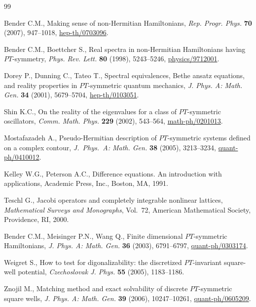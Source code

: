 \documentclass[pdftex]{sigma}
\numberwithin{equation}{section}
\begin{document}
\begin{thebibliography}{99}

\footnotesize\itemsep=0pt

\bibitem{[1]} Bender C.M., Making sense of non-Hermitian Hamiltonians,
\textit{Rep. Progr. Phys.} \textbf{70} (2007), 947--1018, \mbox{\href{http://arxiv.org/abs/hep-th/0703096}{hep-th/0703096}}.

\bibitem{[2]} Bender C.M., Boettcher S., Real spectra in non-Hermitian
Hamiltonians having $PT$-symmetry, \textit{Phys. Rev. Lett.} \textbf{80}
(1998), 5243--5246, \href{http://arxiv.org/abs/physics/9712001}{physics/9712001}.

\bibitem{[3]} Dorey P., Dunning C., Tateo T., Spectral equivalences, Bethe
ansatz equations, and reality properties in $PT$-symmetric quantum
mechanics, \textit{J. Phys. A: Math. Gen.} \textbf{34} (2001), 5679--5704, \href{http://arxiv.org/abs/hep-th/0103051}{hep-th/0103051}.

\bibitem{[4]} Shin K.C., On the reality of the eigenvalues for a class of $PT$-symmetric oscillators, \textit{Comm. Math. Phys.} \textbf{229}
(2002), 543--564, \href{http://arxiv.org/abs/math-ph/0201013}{math-ph/0201013}.

\bibitem{[5]} Mostafazadeh A., Pseudo-Hermitian description of $PT$-symmetric systems def\/ined on a complex contour, \textit{J.~Phys.~A: Math.
Gen.} \textbf{38} (2005), 3213--3234, \href{http://arxiv.org/abs/quant-ph/0410012}{quant-ph/0410012}.

\bibitem{[6]} Kelley W.G., Peterson A.C., Dif\/ference equations. An
introduction with applications, Academic Press, Inc., Boston, MA,  1991.

\bibitem{[7]} Teschl G., Jacobi operators and completely integrable
nonlinear lattices, {\it Mathematical Surveys and Monographs}, Vol.~72, American Mathematical Society, Providence, RI, 2000.

\bibitem{[8]} Bender C.M., Meisinger P.N., Wang Q., Finite dimensional $PT$-symmetric Hamiltonians, \textit{J. Phys. A: Math. Gen.} \textbf{36} (2003), 6791--6797, \href{http://arxiv.org/abs/quant-ph/0303174}{quant-ph/0303174}.

\bibitem{[9]} Weigret S., How to test for digonalizability: the discretized $PT$-invariant square-well potential, \textit{Czechoslovak J. Phys.} \textbf{55}
(2005), 1183--1186.

\bibitem{[10]} Znojil M., Matching method and exact solvability of discrete $PT$-symmetric square wells, \textit{J. Phys. A: Math. Gen.} \textbf{39}
(2006), 10247--10261, \href{http://arxiv.org/abs/quant-ph/0605209}{quant-ph/0605209}.


\end{thebibliography}
\end{document}
